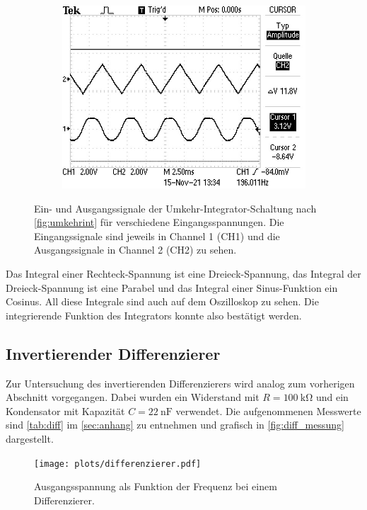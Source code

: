 \begin{figure}[H]
\begin{subfigure}{.4\textwidth}
    \includegraphics[width=\linewidth]{data/ALL0061/F0061TEK.JPG}
  \end{subfigure}
  \caption{Ein- und Ausgangssignale der Umkehr-Integrator-Schaltung nach \autoref{fig:umkehrint}  für verschiedene Eingangsspannungen. Die Eingangssignale sind jeweils in Channel 1 (CH1) und die Ausgangssignale in Channel 2 (CH2) zu sehen.}
  \label{fig:int_oszi}
\end{figure}

Das Integral einer Rechteck-Spannung ist eine Dreieck-Spannung, das Integral der Dreieck-Spannung ist eine Parabel und das Integral einer Sinus-Funktion ein Cosinus. All diese Integrale sind auch auf dem Oszilloskop zu sehen. Die integrierende Funktion des Integrators konnte also bestätigt werden.

\newpage
\subsection{Invertierender Differenzierer}
Zur Untersuchung des invertierenden Differenzierers wird analog zum vorherigen Abschnitt vorgegangen. Dabei wurden ein Widerstand mit $R = \SI{100}{\kilo\ohm}$ und ein Kondensator mit Kapazität $C = \SI{22}{\nano\farad}$ verwendet. Die aufgenommenen Messwerte sind \autoref{tab:diff} im \autoref{sec:anhang} zu entnehmen und grafisch in \autoref{fig:diff_messung} dargestellt.

\begin{figure}[H]
  \centering
  \texttt{[image: plots/differenzierer.pdf]}
  \caption{Ausgangsspannung als Funktion der Frequenz bei einem Differenzierer.}
  \label{fig:diff_messung}
\end{figure}

